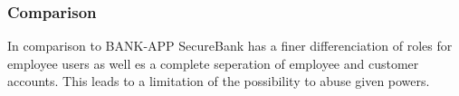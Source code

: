 \subsubsection{Comparison}
In comparison to BANK-APP SecureBank has a finer differenciation of roles for employee users as well es a complete seperation of employee and customer accounts. This leads to a limitation of the possibility to abuse given powers.
\clearpage